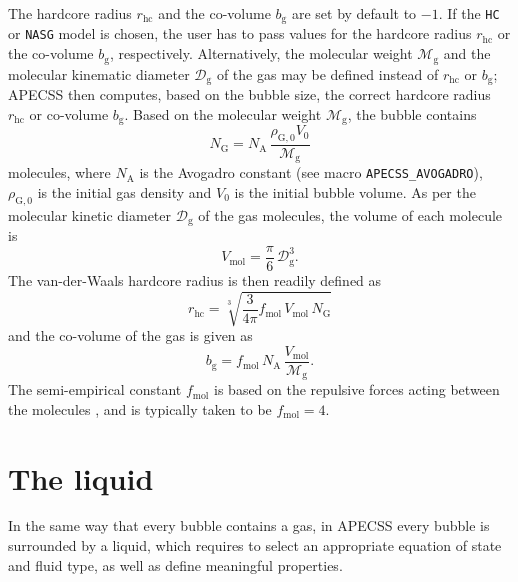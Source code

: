 The hardcore radius $r_\mathrm{hc}$ and the co-volume $b_\mathrm{g}$ are set by default to $-1$. If the {\tt HC} or {\tt NASG} model is chosen, the user has to pass values for the hardcore radius $r_\mathrm{hc}$ or the co-volume $b_\mathrm{g}$, respectively. Alternatively, the molecular weight $\mathcal{M}_{\text{g}}$ and the molecular kinematic diameter $\mathcal{D}_{\text{g}}$ of the gas may be defined instead of $r_\mathrm{hc}$ or $b_\mathrm{g}$; APECSS then computes, based on the bubble size, the correct hardcore radius $r_\mathrm{hc}$ or  co-volume $b_\mathrm{g}$. Based on the molecular weight $\mathcal{M}_{\text{g}}$, the bubble contains 
\begin{equation}
    N_\mathrm{G} = N_\mathrm{A} \, \frac{\rho_{\mathrm{G},0} V_0}{\mathcal{M}_{\text{g}}} 
\end{equation}
molecules, where $N_\mathrm{A}$ is the Avogadro constant (see macro {\tt APECSS\_AVOGADRO}), $\rho_{\mathrm{G},0}$ is the initial gas density and $V_0$ is the initial bubble volume. As per the molecular kinetic diameter $\mathcal{D}_{\text{g}}$ of the gas molecules, the volume of each molecule is
\begin{equation}
    V_\mathrm{mol} = \frac{\pi}{6} \, \mathcal{D}_{\text{g}}^3.
\end{equation}
The van-der-Waals hardcore radius is then readily defined as
\begin{equation}
    r_\mathrm{hc} = \sqrt[3]{\frac{3}{4 \pi} f_\mathrm{mol} \, V_\mathrm{mol} \, N_\mathrm{G}}
\end{equation}
and the co-volume of the gas is given as
\begin{equation}
    b_\mathrm{g} = f_\mathrm{mol} \, N_\mathrm{A} \, \frac{V_\mathrm{mol}}{\mathcal{M}_{\text{g}}}.
\end{equation}
The semi-empirical constant $f_\mathrm{mol}$ is based on the repulsive forces acting between the molecules \citep{Kontogeorgis2019,vanderWaals1998}, and is typically taken to be $f_\mathrm{mol}=4$.


\section{The liquid}
\label{sec:liquid}

In the same way that every bubble contains a gas, in APECSS every bubble is surrounded by a liquid, which requires to select an appropriate equation of state and fluid type, as well as define meaningful properties.

\vspace{0.8em}

